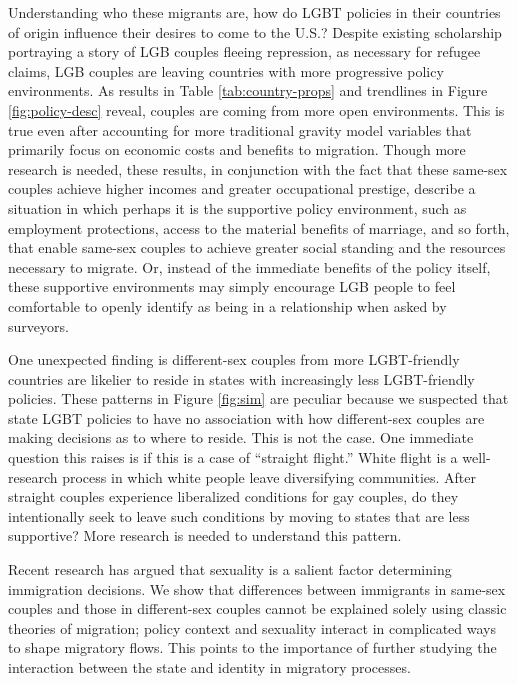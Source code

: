 \documentclass[
  11pt,
]{article}
\begin{document}
Understanding who these migrants are, how do LGBT policies in their countries of origin influence their desires to come to the U.S.? Despite existing scholarship portraying a story of LGB couples fleeing repression, as necessary for refugee claims, LGB couples are leaving countries with more progressive policy environments. As results in Table \ref{tab:country-props} and trendlines in Figure \ref{fig:policy-desc} reveal, couples are coming from more open environments. This is true even after accounting for more traditional gravity model variables that primarily focus on economic costs and benefits to migration. Though more research is needed, these results, in conjunction with the fact that these same-sex couples achieve higher incomes and greater occupational prestige, describe a situation in which perhaps it is the supportive policy environment, such as employment protections, access to the material benefits of marriage, and so forth, that enable same-sex couples to achieve greater social standing and the resources necessary to migrate. Or, instead of the immediate benefits of the policy itself, these supportive environments may simply encourage LGB people to feel comfortable to openly identify as being in a relationship when asked by surveyors.

One unexpected finding is different-sex couples from more LGBT-friendly countries are likelier to reside in states with increasingly less LGBT-friendly policies. These patterns in Figure \ref{fig:sim} are peculiar because we suspected that state LGBT policies to have no association with how different-sex couples are making decisions as to where to reside. This is not the case. One immediate question this raises is if this is a case of ``straight flight.'' White flight is a well-research process in which white people leave diversifying communities. After straight couples experience liberalized conditions for gay couples, do they intentionally seek to leave such conditions by moving to states that are less supportive? More research is needed to understand this pattern.

Recent research has argued that sexuality is a salient factor determining immigration decisions. We show that differences between immigrants in same-sex couples and those in different-sex couples cannot be explained solely using classic theories of migration; policy context and sexuality interact in complicated ways to shape migratory flows. This points to the importance of further studying the interaction between the state and identity in migratory processes.
\end{document}
